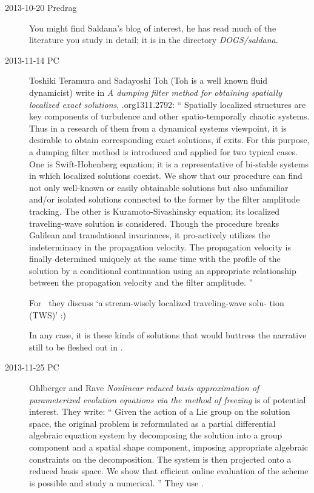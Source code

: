 \begin{description}
\item[2013-10-20 Predrag] You might find Saldana's blog of interest, he
has read much of the literature you study in detail; it is
in the directory \emph{DOGS/saldana}.

\item[2013-11-14 PC]
Toshiki Teramura and Sadayoshi Toh (Toh is a well known fluid dynamicist)
write in {\em A dumping filter method for obtaining spatially localized exact
  solutions}, \arXiv.org{1311.2792}:
``
  Spatially localized structures are key components of turbulence and other
spatio-temporally chaotic systems. Thus in a research of them from a dynamical
systems viewpoint, it is desirable to obtain corresponding exact solutions, if
exits. For this purpose, a dumping filter method is introduced and applied for
two typical cases. One is Swift-Hohenberg equation; it is a representative of
bi-stable systems in which localized solutions coexist. We show that our
procedure can find not only well-known or easily obtainable solutions but also
unfamiliar and/or isolated solutions connected to the former by the filter
amplitude tracking. The other is Kuramoto-Sivashinsky equation; its localized
traveling-wave solution is considered. Though the procedure breaks Galilean and
translational invariances, it pro-actively utilizes the indeterminacy in the
propagation velocity. The propagation velocity is finally determined uniquely
at the same time with the profile of the solution by a conditional continuation
using an appropriate relationship between the propagation velocity and the
filter amplitude.
''

For \KS\ they discuss `a stream-wisely localized  traveling-wave solu-
tion (TWS)' :)

In any case, it is these kinds of solutions that would buttress the narrative
still to be fleshed out in .

\item[2013-11-25 PC]
Ohlberger and Rave
{\em Nonlinear reduced basis approximation of parameterized evolution
        equations via the method of freezing} is of potential interest.
They write: ``
Given the action of a Lie group on the solution space, the original
problem is reformulated as a partial differential algebraic equation
system by decomposing the solution into a group component and a spatial
shape component, imposing appropriate algebraic constraints on the
decomposition. The system is then projected onto a reduced basis space.
We show that efficient online evaluation of the scheme is possible and
study a numerical.
''
They use {\mconn}.


\end{description}
